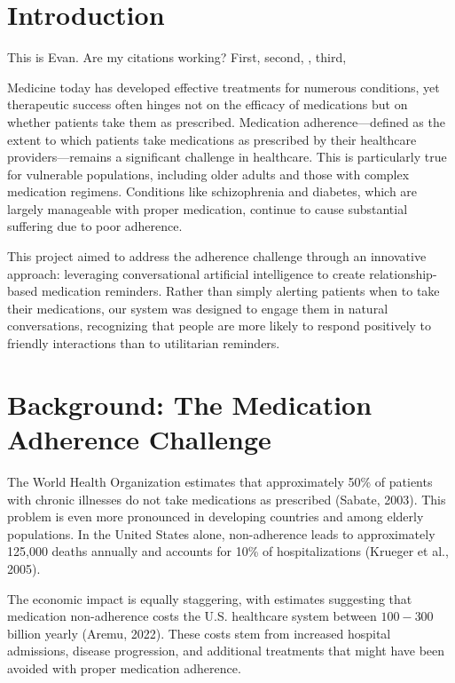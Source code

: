 \documentclass[sigconf]{acmart}
\begin{document}
\section{Introduction}
This is Evan. Are my citations working? First\cite{Krueger2005}, second, \cite{Wilhelmsen2019}, third, \cite{Gast2019}


Medicine today has developed effective treatments for numerous conditions, yet therapeutic success often hinges not on the efficacy of medications but on whether patients take them as prescribed. Medication adherence—defined as the extent to which patients take medications as prescribed by their healthcare providers—remains a significant challenge in healthcare. This is particularly true for vulnerable populations, including older adults and those with complex medication regimens. Conditions like schizophrenia and diabetes, which are largely manageable with proper medication, continue to cause substantial suffering due to poor adherence.

This project aimed to address the adherence challenge through an innovative approach: leveraging conversational artificial intelligence to create relationship-based medication reminders. Rather than simply alerting patients when to take their medications, our system was designed to engage them in natural conversations, recognizing that people are more likely to respond positively to friendly interactions than to utilitarian reminders.

\section{Background: The Medication Adherence Challenge}
The World Health Organization estimates that approximately 50\% of patients with chronic illnesses do not take medications as prescribed (Sabate, 2003)\cite{Sabate2003}. This problem is even more pronounced in developing countries and among elderly populations. In the United States alone, non-adherence leads to approximately 125,000 deaths annually and accounts for 10\% of hospitalizations (Krueger et al., 2005)\cite{Krueger2005}.

The economic impact is equally staggering, with estimates suggesting that medication non-adherence costs the U.S. healthcare system between $100-$300 billion yearly (Aremu, 2022)\cite{Aremu2022}. These costs stem from increased hospital admissions, disease progression, and additional treatments that might have been avoided with proper medication adherence.
\end{document}
